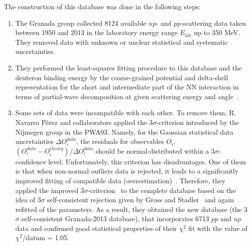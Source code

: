 The construction of this database was done in the following steps:
\begin{enumerate}
\item The Granada group collected 8124 available $np$- and $pp$-scattering data taken between 1950 and 2013 in the laboratory energy range $E_{\mathrm{lab}}$ up to 350 MeV. They removed data with unknown or unclear statistical and systematic uncertainties.
\item They performed the least-squares fitting procedure to this database and the deuteron binding energy by the coarse-grained potential and delta-shell representation for the short and intermediate part of the NN interaction in terms of partial-wave decomposition at given scattering energy and angle~\cite{Perez2013, NavarroPerez2015}. 
\item Some sets of data were incompatible with each other. To remove them, R. Navarro P{\' e}rez and collaborators applied the 3$\sigma$-criterion introduced by the Nijmegen group in the PWA93. Namely, for the Gaussian statistical data uncertainties $\Delta O^{data}_{i}$, the residuals for observables $O_{i}$, $\left(O^{data}_{i} - O^{theory}_{i}\right)/\Delta O^{data}_{i}$ should be normal-distributed within a  3$\sigma$-confidence level. Unfortunately, this criterion has disadvantages. One of them is that when non-normal outliers data is rejected, it leads to a significantly improved fitting of compatible data (overestimation)~\cite{Perez2013}. Therefore, they applied the improved 3$\sigma$-criterion~\cite{Perez2013} to the complete database based on the idea of 3$\sigma$ self-consistent rejection given by Gross and Stadler~\cite{gross2008covariant} and again refitted of the parameters. As a result, they obtained the new database (the 3$\sigma$ self-consistent Granada-2013 database), that incorporates 6713 $pp$ and $np$ data and confirmed good statistical properties of their $\chi^{2}$ fit with the value of $\chi^{2}$/datum = 1.05.

\end{enumerate}

